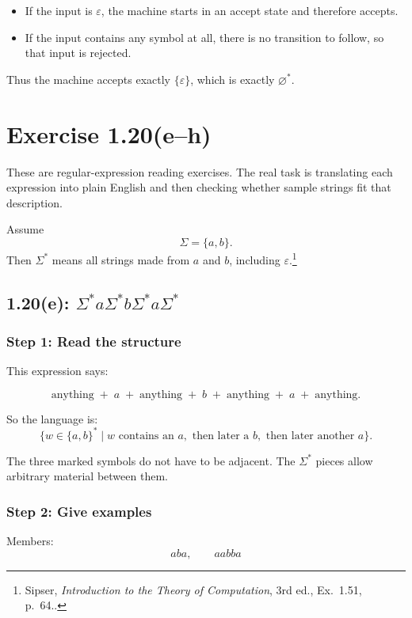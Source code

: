 \documentclass[12pt]{article}
\newcommand{\sipser}[1]{\footnote{Sipser, \emph{Introduction to the Theory of Computation}, 3rd ed., #1.}}
\begin{document}
\begin{itemize}[itemsep=0.3em]
    \item If the input is \(\varepsilon\), the machine starts in an accept state and therefore accepts.
    \item If the input contains any symbol at all, there is no transition to follow, so that input is rejected.
\end{itemize}

Thus the machine accepts exactly \(\{\varepsilon\}\), which is exactly \(\varnothing^*\).

\newpage
\section*{Exercise 1.20(e--h)}

These are regular-expression reading exercises. The real task is translating each expression into plain English and then checking whether sample strings fit that description.

Assume
\[
\Sigma=\{a,b\}.
\]
Then \(\Sigma^*\) means all strings made from \(a\) and \(b\), including \(\varepsilon\).\sipser{Ex.~1.51, p.~64.}

\subsection*{1.20(e): \(\Sigma^*a\Sigma^*b\Sigma^*a\Sigma^*\)}

\subsubsection*{Step 1: Read the structure}

This expression says:

\[
\text{anything} \;+\; a \;+\; \text{anything} \;+\; b \;+\; \text{anything} \;+\; a \;+\; \text{anything}.
\]

So the language is:
\[
\{w\in\{a,b\}^* \mid w \text{ contains an } a,\text{ then later a } b,\text{ then later another } a\}.
\]

The three marked symbols do not have to be adjacent. The \(\Sigma^*\) pieces allow arbitrary material between them.

\subsubsection*{Step 2: Give examples}

Members:
\[
aba,\qquad aabba
\]
\end{document}
